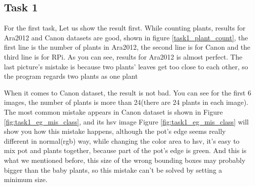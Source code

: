 \documentclass[conference]{IEEEtran}
\begin{document}
\subsection{Task 1}
For the first task, Let us show the result first. While counting plants, results for Ara2012 and Canon datasets are good, shown in figure \ref{task1_plant_count}, the first line is the number of plants in Ara2012, the second line is for Canon and the third line is for RPi. As you can see, results for Ara2012 is almost perfect. The last picture’s mistake is because two plants’ leaves get too close to each other, so the program regards two plants as one plant

When it comes to Canon dataset, the result is not bad. You can see for the first 6 images, the number of plants is more than 24(there are 24 plants in each image). The most common mistake appears in Canon dataset is shown in Figure \ref{fig:task1_eg_mis_class}, and its hsv image Figure \ref{fig:task1_eg_mis_class} will show you how this mistake happens, although the pot’s edge seems really different in normal(rgb) way, while changing the color area to hsv, it’s easy to mix pot and plants together, because part of 
the pot’s edge is green. And this is what we mentioned before, this size of the wrong bounding boxes may probably  bigger than the baby plants, so this mistake can’t be solved by setting a minimum size.
\end{document}
